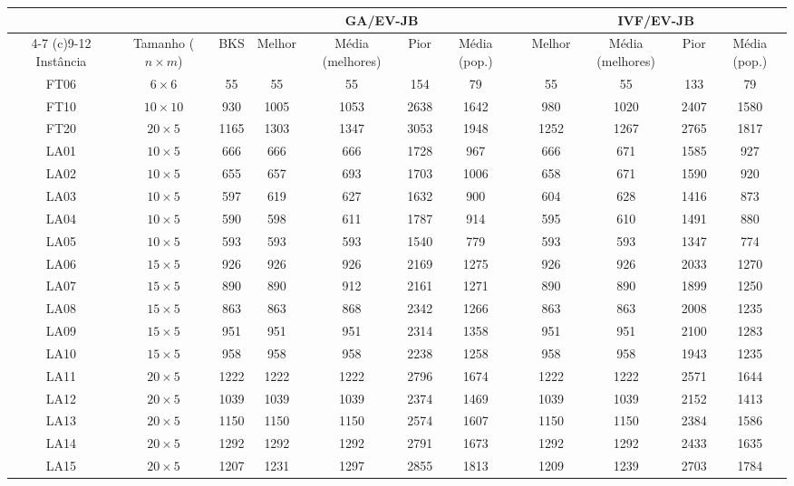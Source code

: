 \begin{sidewaystable}
\caption{Resultados do caso de experimento 7}
\centering
\label{experimento7}
\begin{tabular}{cccccccccccc}
\toprule
& & & \multicolumn{4}{c}{GA/EV-JB} & & \multicolumn{4}{c}{IVF/EV-JB} \\
\cmidrule(c){4-7}
\cmidrule(c){9-12}
Inst\^{a}ncia & Tamanho ($n \times m$) & BKS & Melhor & M\'{e}dia (melhores) & Pior & M\'{e}dia (pop.) & & Melhor & M\'{e}dia (melhores) & Pior & M\'{e}dia (pop.) \\
\midrule
FT06 & $6 \times 6$ & 55 & 55 & 55 & 154 & 79 & & 55 & 55 & 133 & 79 \\
FT10 & $10 \times 10$ & 930 & 1005 & 1053 & 2638 & 1642 & & 980 & 1020 & 2407 & 1580 \\
FT20 & $20 \times 5$ & 1165 & 1303 & 1347 & 3053 & 1948 & & 1252 & 1267 & 2765 & 1817 \\
LA01 & $10 \times 5$ & 666 & 666 & 666 & 1728 & 967 & & 666 & 671 & 1585 & 927 \\
LA02 & $10 \times 5$ & 655 & 657 & 693 & 1703 & 1006 & & 658 & 671 & 1590 & 920 \\
LA03 & $10 \times 5$ & 597 & 619 & 627 & 1632 & 900 & & 604 & 628 & 1416 & 873 \\
LA04 & $10 \times 5$ & 590 & 598 & 611 & 1787 & 914 & & 595 & 610 & 1491 & 880 \\
LA05 & $10 \times 5$ & 593 & 593 & 593 & 1540 & 779 & & 593 & 593 & 1347 & 774 \\
LA06 & $15 \times 5$ & 926 & 926 & 926 & 2169 & 1275 & & 926 & 926 & 2033 & 1270 \\
LA07 & $15 \times 5$ & 890 & 890 & 912 & 2161 & 1271 & & 890 & 890 & 1899 & 1250 \\
LA08 & $15 \times 5$ & 863 & 863 & 868 & 2342 & 1266 & & 863 & 863 & 2008 & 1235 \\
LA09 & $15 \times 5$ & 951 & 951 & 951 & 2314 & 1358 & & 951 & 951 & 2100 & 1283 \\
LA10 & $15 \times 5$ & 958 & 958 & 958 & 2238 & 1258 & & 958 & 958 & 1943 & 1235 \\
LA11 & $20 \times 5$ & 1222 & 1222 & 1222 & 2796 & 1674 & & 1222 & 1222 & 2571 & 1644 \\
LA12 & $20 \times 5$ & 1039 & 1039 & 1039 & 2374 & 1469 & & 1039 & 1039 & 2152 & 1413 \\
LA13 & $20 \times 5$ & 1150 & 1150 & 1150 & 2574 & 1607 & & 1150 & 1150 & 2384 & 1586 \\
LA14 & $20 \times 5$ & 1292 & 1292 & 1292 & 2791 & 1673 & & 1292 & 1292 & 2433 & 1635 \\
LA15 & $20 \times 5$ & 1207 & 1231 & 1297 & 2855 & 1813 & & 1209 & 1239 & 2703 & 1784 \\
\bottomrule
\end{tabular}
\end{sidewaystable}
